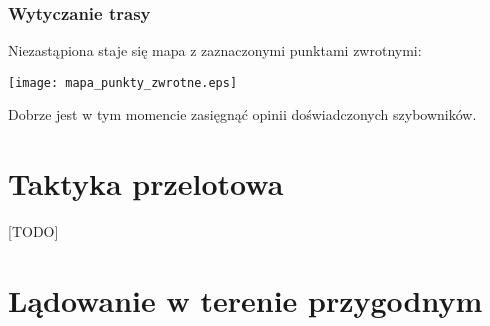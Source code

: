 \documentclass{article}
\begin{document}
\subsubsection{Wytyczanie trasy}
Niezastąpiona staje się mapa z zaznaczonymi punktami zwrotnymi:
\begin{center}
\texttt{[image: mapa\_punkty\_zwrotne.eps]}
\end{center}
Dobrze jest w tym momencie zasięgnąć opinii doświadczonych szybowników.

\newpage

\section{Taktyka przelotowa}
[TODO] %
\newpage

\section{Lądowanie w terenie przygodnym}
\end{document}
